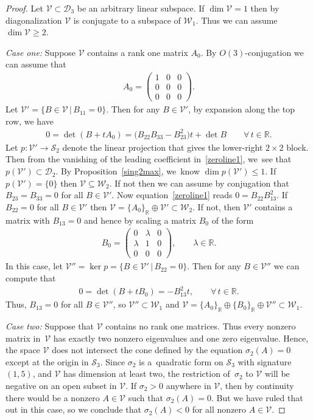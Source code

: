 \documentclass[10pt,a4paper]{amsart}
\def\R{\mathbb{R}}
\def\calS{\mathcal{S}}
\def\V{\mathscr{V}}
\def\W{\mathscr{W}}
\def\D{\mathcal{D}}
\numberwithin{equation}{section}
\begin{document}
\begin{proof}
Let $\V \subset \D_3$ be an arbitrary linear subspace. If $\dim \V=1$ then by diagonalization $\V$ is conjugate to a subspace of $\W_1$. Thus we can assume $\dim \V \ge 2$.

\emph{Case one:} Suppose $\V$ contains a rank one matrix $A_0$. By $O(3)$-conjugation we can assume that
\begin{gather*} %
A_0 = \begin{pmatrix} 1 & 0 & 0 \\ 0 & 0 & 0 \\ 0 & 0 & 0 \end{pmatrix} .
\end{gather*}
Let $\V' = \{ B \in \V \,|\, B_{11}=0\}$. Then for any $B \in \V'$, by expansion along the top row, we have
\begin{gather} \label{zeroline1}
0 = \det(B+ t A_0) = \big(B_{22}B_{33}-B_{23}^2\big) t + \det B \qquad
\forall\, t \in \R.
\end{gather}
Let $p\colon \V' \to \calS_2$ denote the linear projection that gives the lower-right $2\times 2$ block. Then from the vanishing of the leading coefficient in~\eqref{zeroline1}, we~see that $p(\V') \subset \D_2$. By Proposition~\ref{sing2max}, we~know $\dim p(\V') \leq 1$. If $p(\V') = \{ 0 \}$ then $\V \subseteq \W_2$. If not then we can assume by conjugation that $B_{23}=B_{33}=0$ for all $B\in \V'$. Now equation~\eqref{zeroline1} reads $0 = B_{22} B_{13}^2$. If $B_{22}=0$ for all $B \in \V'$ then $\V = \{ A_0 \}_\R \oplus \V' \subset \W_2$. If not, then $\V'$ contains a matrix with $B_{13} = 0$ and hence by scaling a matrix $B_0$ of the form
\begin{gather*}
B_0 = \begin{pmatrix} 0 & \lambda & 0 \\ \lambda & 1 & 0 \\ 0 & 0 & 0 \end{pmatrix} ,\qquad \lambda \in \R.
\end{gather*}
In this case, let $\V'' = \ker p = \{ B \in \V' \,|\, B_{22}=0 \}.$ Then for any $B \in \V''$ we can compute that
\begin{gather*}
0 = \det (B + t B_0) = - B_{13}^2 t, \qquad\forall\, t \in \R.
\end{gather*}
Thus, $B_{13} = 0$ for all $B \in \V''$, so $\V'' \subset \W_1$ and $\V = \{ A_0 \}_\R \oplus \{ B_0 \}_\R \oplus \V'' \subset \W_1$.

\emph{Case two:} Suppose that $\V$ contains no rank one matrices. Thus every nonzero matrix in~$\V$ has exactly two nonzero eigenvalues and one zero eigenvalue. Hence, the space $\V$ does not intersect the cone defined by the equation $\sigma_2(A)=0$ except at the origin in $\calS_3$. Since $\sigma_2$ is a~quadratic form on $\calS_3$ with signature $(1,5)$, and $\V$ has dimension at least two, the restriction of~$\sigma_2$ to $\V$ will be negative on an open subset in $\V$. If $\sigma_2 > 0$ anywhere in $\V$, then by continuity there would be a nonzero $A \in \V$ such that $\sigma_2(A) = 0$. But we have ruled that out in this case, so we conclude that $\sigma_2(A) < 0$ for all nonzero $A \in \V$.


\end{proof}
\end{document}
